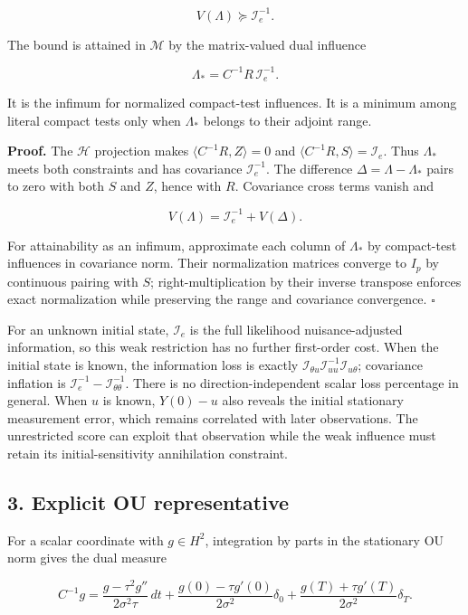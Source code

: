\documentclass[
  american,
  11pt,
]{article}
\begin{document}
\[
V(\Lambda)\succeq\mathcal I_e^{-1}.
\]

The bound is attained in \(\mathcal M\) by the matrix-valued dual
influence

\[
\Lambda_*=C^{-1}R\,\mathcal I_e^{-1}.
\]

It is the infimum for normalized compact-test influences. It is a
minimum among literal compact tests only when \(\Lambda_*\) belongs to
their adjoint range.

\textbf{Proof.} The \(\mathcal H\) projection makes
\(\langle C^{-1}R,Z\rangle=0\) and
\(\langle C^{-1}R,S\rangle=\mathcal I_e\). Thus \(\Lambda_*\) meets both
constraints and has covariance \(\mathcal I_e^{-1}\). The difference
\(\Delta=\Lambda-\Lambda_*\) pairs to zero with both \(S\) and \(Z\),
hence with \(R\). Covariance cross terms vanish and

\[
V(\Lambda)=\mathcal I_e^{-1}+V(\Delta).
\]

For attainability as an infimum, approximate each column of
\(\Lambda_*\) by compact-test influences in covariance norm. Their
normalization matrices converge to \(I_p\) by continuous pairing with
\(S\); right-multiplication by their inverse transpose enforces exact
normalization while preserving the range and covariance convergence.
\(\square\)

For an unknown initial state, \(\mathcal I_e\) is the full likelihood
nuisance-adjusted information, so this weak restriction has no further
first-order cost. When the initial state is known, the information loss
is exactly
\(\mathcal I_{\theta u}\mathcal I_{uu}^{-1}\mathcal I_{u\theta}\);
covariance inflation is
\(\mathcal I_e^{-1}-\mathcal I_{\theta\theta}^{-1}\). There is no
direction-independent scalar loss percentage in general. When \(u\) is
known, \(Y(0)-u\) also reveals the initial stationary measurement error,
which remains correlated with later observations. The unrestricted score
can exploit that observation while the weak influence must retain its
initial-sensitivity annihilation constraint.

\subsection{3. Explicit OU
representative}\label{explicit-ou-representative}

For a scalar coordinate with \(g\in H^2\), integration by parts in the
stationary OU norm gives the dual measure

\[
C^{-1}g=
\frac{g-\tau^2g''}{2\sigma^2\tau}\,dt
+\frac{g(0)-\tau g'(0)}{2\sigma^2}\delta_0
+\frac{g(T)+\tau g'(T)}{2\sigma^2}\delta_T.
\]
\end{document}
